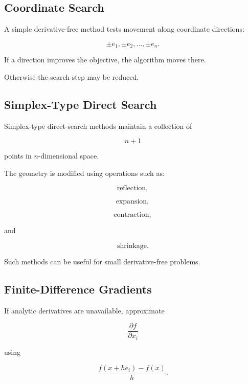 \subsection{Coordinate Search}
\label{subsec:coordinate-search}

A simple derivative-free method tests movement along coordinate
directions:

\[
\boxed{
\pm e_1,
\pm e_2,
\ldots,
\pm e_n.
}
\]

If a direction improves the objective, the algorithm moves there.

Otherwise the search step may be reduced.

\subsection{Simplex-Type Direct Search}
\label{subsec:simplex-direct-search}

Simplex-type direct-search methods maintain a collection of

\[
n+1
\]

points in \(n\)-dimensional space.

The geometry is modified using operations such as:

\[
\boxed{
\text{reflection},
}
\]

\[
\boxed{
\text{expansion},
}
\]

\[
\boxed{
\text{contraction},
}
\]

and

\[
\boxed{
\text{shrinkage}.
}
\]

Such methods can be useful for small derivative-free problems.

\subsection{Finite-Difference Gradients}
\label{subsec:finite-difference-gradients}

If analytic derivatives are unavailable, approximate

\[
\frac{\partial f}{\partial x_i}
\]

using

\[
\boxed{
\frac{
f(x+he_i)-f(x)
}{
h
}.
}
\]

